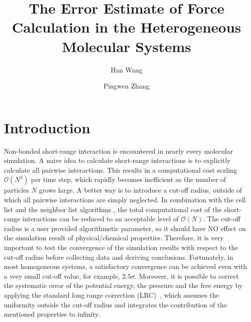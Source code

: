 \documentclass[aps,pre,preprint]{revtex4-1}
\begin{document}
\title{The Error Estimate of Force Calculation in the Heterogeneous Molecular Systems}
\author{Han Wang}
\author{Pingwen Zhang}

\begin{abstract}
\end{abstract}

\maketitle

\section{Introduction}
Non-bonded short-range interaction is encountered in nearly every
molecular simulation.  A naive idea to calculate short-range
interactions is to explicitly calculate all pairwise
interactions. This results in a computational cost scaling $\mathcal
O(N^2)$ per time step, which rapidly becomes inefficient as the number
of particles $N$ grows large. A better way is to introduce a cut-off
radius, outside of which all pairwise interactions are simply
neglected. In combination with the cell list and the neighbor list
algorithms \cite{frenkel02b}, the total computational cost of the
short-range interactions can be reduced to an acceptable level of
$\mathcal O(N)$. The cut-off radius is a user provided algorithmetic
parameter, so it should have NO effect on the simulation result of
physical/chemical properties.  Therefore, it is very important to test
the convergence of the simulation results with respect to the cut-off
radius before collecting data and deriving conclusions. Fortunately,
in most homogeneous systems, a satisfactory convergence can be
achieved even with a very small cut-off value, for example,
$2.5\sigma$.  Moreover, it is possible to correct the systematic error
of the potential energy, the pressure and the free energy by applying
the standard long range correction (LRC)~\cite{allen87a}, which
assumes the uniformity outside the cut-off radius and integrates the
contribution of the mentioned properties to infinity. 
\end{document}
